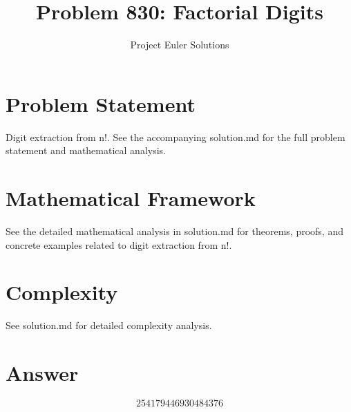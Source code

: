 \documentclass[11pt]{article}
\title{Problem 830: Factorial Digits}
\author{Project Euler Solutions}
\date{}
\begin{document}
\maketitle

\section{Problem Statement}

Digit extraction from n!. See the accompanying solution.md for the full problem statement and mathematical analysis.

\section{Mathematical Framework}

See the detailed mathematical analysis in solution.md for theorems, proofs, and concrete examples related to digit extraction from n!.

\section{Complexity}

See solution.md for detailed complexity analysis.

\section{Answer}

\[
\boxed{254179446930484376}
\]
\end{document}
